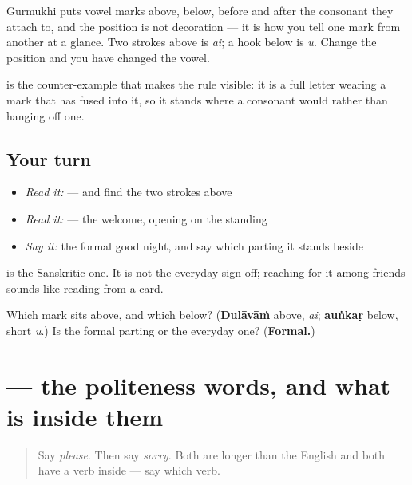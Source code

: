 Gurmukhi puts vowel marks above, below, before and after the consonant they attach to, and the position is not decoration — it is how you tell one mark from another at a glance. Two strokes above is \emph{ai}; a hook below is \emph{u}. Change the position and you have changed the vowel.

\textbf{} is the counter-example that makes the rule visible: it is a full letter wearing a mark that has fused into it, so it stands where a consonant would rather than hanging off one.

\subsection*{Your turn}
\begin{itemize}
\raggedright
  \item \emph{Read it:} \textbf{} — and find the two strokes above
  \item \emph{Read it:} \textbf{  } — the welcome, opening on the standing \textbf{}
  \item \emph{Say it:} the formal good night, and say which parting it stands beside
\end{itemize}

\textbf{ } is the Sanskritic one. It is not the everyday sign-off; reaching for it among friends sounds like reading from a card.

\begin{tcolorbox}[breakable,colback=teal!4,colframe=teal!35!black,title={Before you move on}]
Which mark sits above, and which below? (\textbf{Dulāvāṁ} above, \emph{ai}; \textbf{auṅkaṛ} below, short \emph{u}.) Is \textbf{ } the formal parting or the everyday one? (\textbf{Formal.})
\end{tcolorbox}
\section[\texorpdfstring{\pa{ਮਿਹਰਬਾਨੀ} \pa{ਕਰਕੇ} … (miharbānī karke …)}{ਮਿਹਰਬਾਨੀ ਕਰਕੇ … (miharbānī karke …)}]{  — the politeness words, and what is inside them}

\label{lesson:PA-R48-courtesy-and-parting}



\begin{quote}
Say \emph{please}. Then say \emph{sorry}. Both are longer than the English and both have a verb inside — say which verb.
\end{quote}

